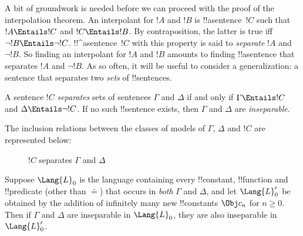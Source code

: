 \documentclass[../../../include/open-logic-section]{subfiles}
\begin{document}


A bit of groundwork is needed before we can proceed with the proof of
the interpolation theorem. An interpolant for $!A$ and $!B$ is
!!a{sentence}~$!C$ such that $!A \Entails !C$ and $!C \Entails !B$.
By contraposition, the latter is true iff $\lnot !B \Entails \lnot
!C$. !!^a{sentence}~$!C$ with this property is said to \emph{separate}
$!A$ and $\lnot !B$.  So finding an interpolant for $!A$ and $!B$
amounts to finding !!a{sentence} that separates $!A$ and $\lnot !B$.
As so often, it will be useful to consider a generalization: a
sentence that separates two \emph{sets} of !!{sentence}s.

\begin{defn}
A sentence $!C$ \emph{separates} sets of sentences $\Gamma$ and
$\Delta$ if and only if $\Gamma \Entails !C$ and $\Delta \Entails
\lnot !C$. If no such !!{sentence} exists, then $\Gamma$ and $\Delta$
are \emph{inseparable}.
\end{defn}

The inclusion relations between the classes of
models of $\Gamma$, $\Delta$ and $!C$ are represented below:
\begin{figure}[h]
  \centering
  \caption{$!C$ separates $\Gamma$ and $\Delta$}
\end{figure}


\begin{lem}
Suppose $\Lang{L}_0$ is the language containing every !!{constant},
!!{function} and !!{predicate} (other than $\doteq$) that occurs in
\emph{both} $\Gamma$ and $\Delta$, and let $\Lang{L}'_0$ be obtained
by the addition of infinitely many new !!{constant}s $\Obj c_n$ for $n
\ge 0$. Then if $\Gamma$ and $\Delta$ are inseparable in $\Lang{L}_0$,
they are also inseparable in $\Lang{L}'_0$.
\end{lem}
\end{document}
